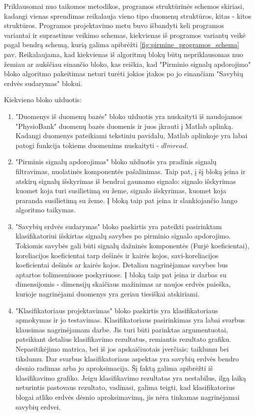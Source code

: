 \documentclass[10pt,onecolumn,draftcls]{IEEEtran}
\begin{document}
Priklausomai nuo taikomos metodikos, programos struktūrinės schemos
skiriasi, kadangi vienas sprendimas reikalauja vieno tipo duomenų
struktūros, kitas - kitos struktūros. Programos projektavimo metu buvo
išbandyti keli programos variantai ir suprastinus veikimo schemas,
kiekvienas iš programos variantų veikė pagal bendrą schemą, kurią
galima apibrėžti \ref{fig:pirmine_programos_schema} pav. Reikalaujama,
kad kiekvienas iš algoritmų blokų būtų nepriklausomas nuo žemiau ar
aukščiau einančio bloko, kas reiškia, kad "Pirminio signalų
apdorojimo" bloko algoritmo pakeitimas neturi turėti jokios įtakos po
jo einančiam "Savybių erdvės sudarymas" blokui. 

Kiekvieno bloko užduotis:

\begin{enumerate}
\item "Duomenys iš duomenų bazės" bloko užduotis yra nuskaityti iš
  naudojamos "PhysioBank" duomenų bazės duomenis ir juos įkrauti į
  Matlab aplinką. Kadangi duomenys pateikiami tekstiniu pavidalu,
  Matlab aplinkoje yra labai patogi funkcija tokiems duomenims
  nuskaityti - $dlmread$.
\item "Pirminis signalų apdorojimas" bloko užduotis yra pradinis
  signalų filtravimas, nuolatinės komponentės pašalinimas. Taip pat, į
  šį bloką įeina ir atskirų signalų išskyrimas iš bendrai gaunamo
  signalo: signalo išskyrimas kuomet koja turi susilietimą su žeme,
  signalo išskyrimas, kuomet koja praranda susilietimą su žeme. Į
  bloką taip pat įeina ir slankiojančio lango algoritmo taikymas.
\item "Savybių erdvės sudarymas" bloko paskirtis yra pateikti
  pasirinktam klasifikatoriui išskirtas signalų savybes po pirminio
  signalo apdorojimo. Tokiomis savybės gali būti signalų dažninės
  komponentės (Furjė koeficientai), koreliacijos koeficientai tarp
  dešinės ir kairės kojos, savi-koreliacijos koeficientai dešinės ar
  kairės kojos. Detaliau nagrinėjamas savybes bus aptartos
  tolimesniuose poskyriuose. Į bloką taip pat įeina ir darbas su
  dimensijomis - dimensijų skaičiaus mažinimas ar naujos erdvės
  paieška, kurioje nagrinėjami duomenys yra geriau tiesiškai
  atskiriami.
\item "Klasifikatoriaus projektavimas" bloko paskirtis yra
  klasifikatoriaus apmokymas ir jo testavimas. Klasifikatoriaus
  pasirinkimas yra labai svarbus klausimas nagrinėjamam darbe. Jis
  turi būti parinktas argumentuotai, pateikiant detalius klasifikavimo
  rezultatus, remiantis rezultato grafiku. Nepasitikėjimo matrica, bei
  iš jos apskaičiuotais įverčiais: taiklumu bei tikslumu. Dar svarbus
  klasifikatoriaus aspektas yra savybių erdvės bendro dėsnio radimas
  arba jo aproksimacija. Šį faktą galima apibrėžti iš klasifikavimo
  grafiko. Jeigu klasifikavimo rezultatas yra nestabilus, ilgą laiką
  neturintis pastovaus rezultato, vadinasi, galima teigti, kad
  klasifikatorius blogai atliko erdvės dėsnio aproksimavimą, jis nėra
  tinkamas nagrinėjamai savybių erdvei.
\end{enumerate}
\end{document}
